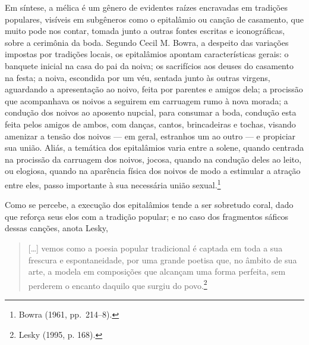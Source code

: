 Em síntese, a mélica é um gênero de evidentes raízes
encravadas em tradições populares, visíveis em subgêneros
como o epitalâmio ou canção de casamento, que muito pode nos contar, tomada
junto a outras fontes escritas e iconográficas, sobre a cerimônia
da boda. Segundo Cecil M. Bowra, a despeito das variações
impostas por tradições locais, os epitalâmios apontam características gerais:
o banquete inicial na casa do pai da noiva; os sacrifícios aos
deuses do casamento na festa; a noiva, escondida por um véu, sentada junto às
outras virgens, aguardando a apresentação ao noivo, feita por parentes e amigos
dela; a procissão que acompanhava os noivos a seguirem em carruagem rumo à nova
morada; a condução dos noivos ao aposento nupcial, para consumar a boda,
condução esta feita pelos amigos de ambos, com danças, cantos, brincadeiras e
tochas, visando amenizar a tensão dos noivos --- em geral, estranhos um ao outro
--- e propiciar sua união. Aliás, a temática dos epitalâmios varia entre a
solene, quando centrada na procissão da carruagem dos noivos, jocosa, quando na
condução deles ao leito, ou elogiosa, quando na aparência física dos noivos de
modo a estimular a atração entre eles, passo importante à sua necessária união
sexual.\footnote{ Bowra (1961, pp.~214--8).}

Como se percebe, a execução dos epitalâmios tende a ser sobretudo coral, dado
que reforça seus elos com a tradição popular; e no caso dos fragmentos sáficos
dessas canções, anota Lesky, 

\begin{quote}
\mbox[\ldots{}] vemos como a poesia popular
tradicional é captada em toda a sua frescura e espontaneidade, por uma grande
poetisa que, no âmbito de sua arte, a modela em composições que alcançam uma
forma perfeita, sem perderem o encanto daquilo que surgiu do povo.\footnote{ Lesky (1995, p. 168).}
\end{quote}

